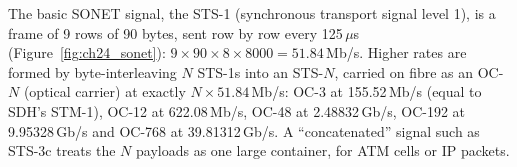The basic SONET signal, the STS-1 (synchronous transport signal level 1), is a frame of 9 rows of
90 bytes, sent row by row every 125\,$\mu$s (Figure~\ref{fig:ch24_sonet}): $9\times90\times8\times8000=
51.84$\,Mb/s. Higher rates are formed by byte-interleaving $N$ STS-1s into an STS-$N$, carried on
fibre as an OC-$N$ (optical carrier) at exactly $N\times51.84$\,Mb/s: OC-3 at 155.52\,Mb/s (equal to
SDH's STM-1), OC-12 at 622.08\,Mb/s, OC-48 at 2.48832\,Gb/s, OC-192 at 9.95328\,Gb/s and OC-768 at
39.81312\,Gb/s. A ``concatenated'' signal such as STS-3c treats the $N$ payloads as one large
container, for ATM cells or IP packets.


